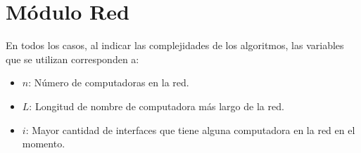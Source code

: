 \section{M\'{o}dulo Red}

  En todos los casos, al indicar las complejidades de los algoritmos, las variables que se utilizan corresponden a:
  \vspace{-0.5em}\begin{itemize}
    \item $n$: N\'umero de computadoras en la red.
    \item $L$: Longitud de nombre de computadora m\'as largo de la red.
    \item $i$: Mayor cantidad de interfaces que tiene alguna computadora en la red en el momento.
  \end{itemize}

